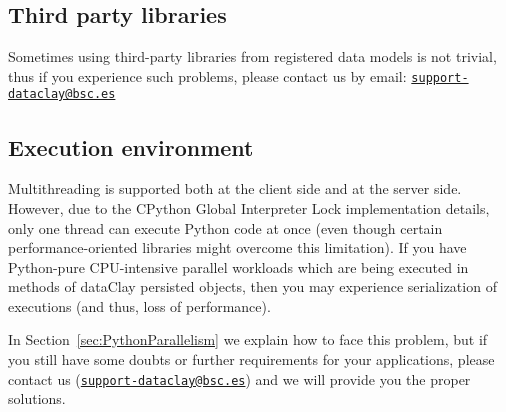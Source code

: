 \subsection{Third party libraries}

Sometimes using third-party libraries from registered data models is not trivial, thus if you experience such problems, please contact us by email: \texttt{\href{mailto:support-dataclay@bsc.es}{support-dataclay@bsc.es}}

\subsection{Execution environment}
\label{sec:PythonConsiderationsExecutionEnvironment}

Multithreading is supported both at the client side and at the server side. However, due to the CPython Global Interpreter Lock implementation details, only one thread can execute Python code at once (even though certain performance-oriented libraries might overcome this limitation). If you have Python-pure CPU-intensive parallel workloads which are being executed in methods of dataClay persisted objects, then you may experience serialization of executions (and thus, loss of performance).

In Section~\ref{sec:PythonParallelism} we explain how to face this problem, but if you still have some doubts or further requirements for your applications, please contact us (\texttt{\href{mailto:support-dataclay@bsc.es}{support-dataclay@bsc.es}}) and we will provide you the proper solutions.
